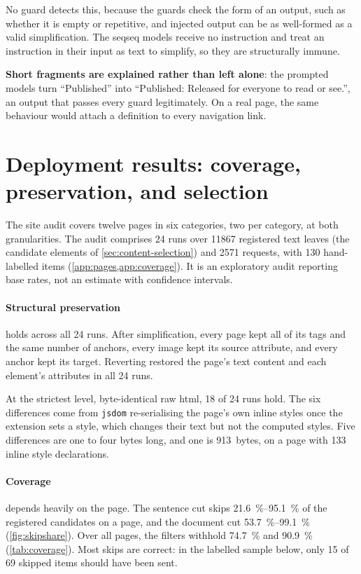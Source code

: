 No guard detects this, because the guards check the form of an output, such as whether it is empty or repetitive, and injected output can be as well-formed as a valid simplification.
The \gls{seqseq} models receive no instruction and treat an instruction in their input as text to simplify, so they are structurally immune.

\textbf{Short fragments are explained rather than left alone}: the prompted models turn ``Published'' into ``Published: Released for everyone to read or see.'', an output that passes every guard legitimately.
On a real page, the same behaviour would attach a definition to every navigation link.

\section{Deployment results: coverage, preservation, and selection}
\label{sec:deployment-results}

The site audit covers twelve pages in six categories, two per category, at both granularities.
The audit comprises 24 runs over \num{11867} registered text leaves (the candidate elements of \cref{sec:content-selection}) and \num{2571} requests, with \num{130} hand-labelled items (\cref{app:pages,app:coverage}).
It is an exploratory audit reporting base rates, not an estimate with confidence intervals.

\paragraph{Structural preservation} holds across all 24 runs.
After simplification, every page kept all of its tags and the same number of anchors, every image kept its source attribute, and every anchor kept its target.
Reverting restored the page's text content and each element's attributes in all 24 runs.

At the strictest level, byte-identical raw \gls{html}, 18 of 24 runs hold.
The six differences come from \texttt{jsdom} re-serialising the page's own inline styles once the extension sets a style, which changes their text but not the computed styles.
Five differences are one to four bytes long, and one is \num{913}~bytes, on a page with \num{133} inline style declarations.

\paragraph{Coverage} depends heavily on the page.
The sentence cut skips \qtyrange{21.6}{95.1}{\percent} of the registered candidates on a page, and the document cut \qtyrange{53.7}{99.1}{\percent} (\cref{fig:skipshare}).
Over all pages, the filters withhold \qty{74.7}{\percent} and \qty{90.9}{\percent} (\cref{tab:coverage}).
Most skips are correct: in the labelled sample below, only 15 of 69 skipped items should have been sent.

